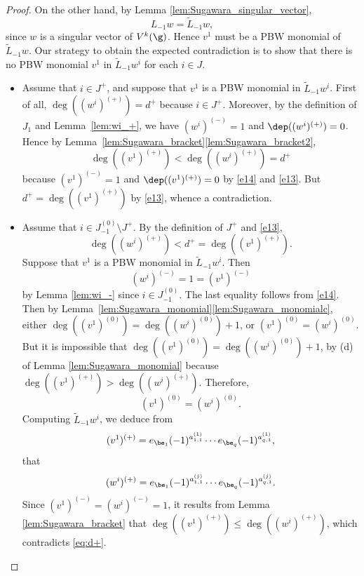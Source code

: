 \begin{proof}
On the other hand, by Lemma \ref{lem:Sugawara_singular_vector},
\begin{equation*}
L_{-1} w={\tilde{L}_{-1} w},
\end{equation*}
since $w$ is a singular vector of $V^k(\g)$.
Hence $v^1$ must be a PBW monomial of {$\tilde{L}_{-1} w$}.
Our strategy to obtain the expected contradiction
is to show that there is no PBW monomial $v^1$ in {$\tilde{L}_{-1} w^i$}
for each $i \in J$.

\begin{itemize}
\item
Assume that $i\in J^+$, and suppose that
$v^{1}$ is a PBW monomial in ${\tilde{L}_{-1} w^{i}}$.
First of all, $\deg((w^{i})^{(+)}) = d^+$
because $i \in J^+$. Moreover,
by the definition of $J_1$ and Lemma~\ref{lem:wi_+},
we have $(w^{i})^{(-)}=1$ and $\dep((w^{i})^{(+)})=0$.
Hence by Lemma~\ref{lem:Sugawara_bracket}\eqref{lem:Sugawara_bracket2},
\[
\deg((v^1)^{(+)}) < \deg((w^{i})^{(+)}) = d^+
\]
because $(v^1)^{(-)}=1$ and $\dep((v^{1})^{(+)})=0$ by \eqref{e14}
and \eqref{e13}.
But $d^+ = \deg((v^1)^{(+)})$ by \eqref{e13},
whence a contradiction.

\item
Assume that $i \in J_{-1}^{(0)} \setminus J^+$.
By the definition of $J^+$ and \eqref{e13},
\begin{equation}
\label{eq:d+}
\deg ((w^{i})^{(+)}) < d^+ =\deg((v^1)^{(+)}).
\end{equation}
Suppose that
$v^{1}$ is a PBW monomial in ${\tilde{L}_{-1} w^{i}}$.
Then
\begin{equation}
\label{e15}
(w^{i})^{(-)}=1 = (v^1)^{(-)}
\end{equation}
by Lemma \ref{lem:wi_-} since $i \in J_{-1}^{(0)}$.
The last equality follows from \eqref{e14}.
Then by Lemma~\ref{lem:Sugawara_monomial}\eqref{lem:Sugawara_monomialc},
either $\deg((v^1)^{(0)})=\deg((w^{i})^{(0)})+1$,
or $(v^1)^{(0)}=(w^{i})^{(0)}.$
But it is impossible that $\deg((v^1)^{(0)})=\deg((w^{i})^{(0)})+1$,
by (d) of Lemma \ref{lem:Sugawara_monomial} because $\deg((v^1)^{(+)}) > \deg ((w^{i})^{(+)})$.
Therefore,
\[
(v^1)^{(0)}=(w^{i})^{(0)}.
\]
Computing $\tilde{L}_{-1} w^{i}$, we deduce from
\[
(v^1)^{(+)}=e_{\be_1}(-1)^{a^{(1)}_{1,1}}\cdots e_{\be_{q}}(-1)^{a^{(1)}_{q,1}},
\]
that
\[
(w^i)^{(+)}=e_{\be_1}(-1)^{a^{(j)}_{1,1}}\cdots e_{\be_{q}}(-1)^{a^{(j)}_{q,1}}.
\]
Since $(v^1)^{(-)}\!=\!(w^{i})^{(-)}\!=\!1$, it
results from Lemma \ref{lem:Sugawara_bracket}
that \hbox{$\deg((v^1)^{(+)})\!\leq\!\deg((w^{i})^{(+)})$},
which contradicts \eqref{eq:d+}.


\end{itemize}
\end{proof}
